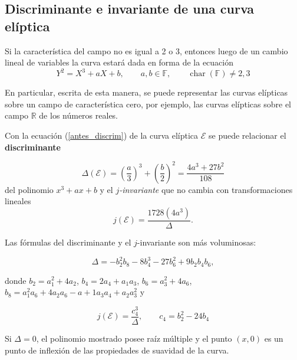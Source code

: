 \documentclass[12pt,oneside]{book}
\newcommand{\car}{\operatorname{char}}
\begin{document}


\subsection{Discriminante e invariante de una curva el\'iptica}

Si la caracter\'istica del campo no es igual a 2 o 3, entonces luego de un cambio lineal de variables la curva estar\'a dada en forma de la ecuaci\'on
\begin{equation}\label{antes_discrim}
Y^2 = X^3 + a X + b,\qquad a,b\in \mathbb{F}, \qquad \car(\mathbb{F})\neq 2,3
\end{equation}

En particular, escrita de esta manera, se puede representar las curvas el\'ipticas sobre un campo de caracter\'istica cero, por ejemplo, las curvas el\'ipticas sobre el campo $\mathbb{R}$ de los n\'umeros reales. 

Con la ecuaci\'on (\ref{antes_discrim}) de la curva el\'iptica $\mathcal{E}$ se puede relacionar el \textbf{discriminante}

\begin{equation}\label{discriminante}
\Delta(\mathcal{E})= \left(\frac{a}{3}\right)^3 +\left(\frac{b}{2}\right)^2 = \frac{4a^3+27b^2}{108}
\end{equation}
del polinomio $x^3+ax+b$ y el \textit{$j$-invariante} que no cambia con transformaciones lineales 
\begin{equation}\label{invariante}
j(\mathcal{E}) = \frac{1728(4a^3)}{\Delta}.
\end{equation}

Las f\'ormulas del discriminante y el $j$-invariante son m\'as voluminosas:

$$\Delta = -b_2^2 b_8 - 8 b_4^3 - 27b_6^2 + 9b_2b_4b_6,$$

donde $b_2 = a_1^2 + 4a_2$, $b_4 = 2a_4 + a_1a_3$, $b_6 = a_3^2 + 4a_6$, $b_8 = a_1^2a_6 + 4a_2a_6 - a+1a_3a_4 + a_2a_3^2$ y 

$$j(\mathcal{E})=\frac{c_4^3}{\Delta}, \qquad c_4 = b_2^2-24b_4$$

Si $\Delta=0$, el polinomio mostrado posee ra\'iz m\'ultiple y el punto $(x,0)$  es un punto de inflexi\'on de las propiedades de suavidad de la curva. %


\end{document}
